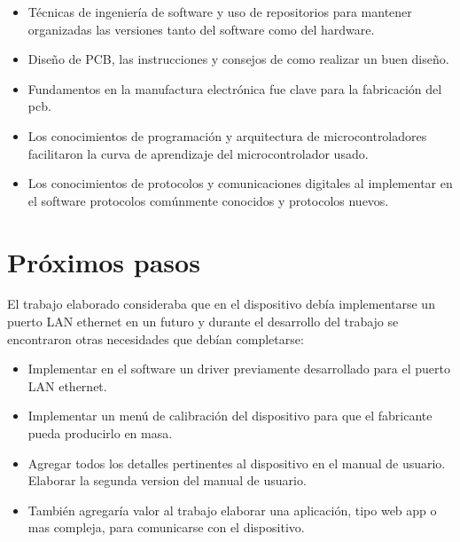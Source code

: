 \begin{itemize}
\item Técnicas de ingeniería de software y uso de repositorios para mantener organizadas las versiones tanto del software como del hardware.
\item Diseño de PCB, las instrucciones y consejos de como realizar un buen diseño.
\item Fundamentos en la manufactura electrónica fue clave para la fabricación del pcb.
\item Los conocimientos de programación y arquitectura de microcontroladores facilitaron la curva de aprendizaje del microcontrolador usado.
\item Los conocimientos de protocolos y comunicaciones digitales al implementar en el software protocolos comúnmente conocidos y protocolos nuevos.
\end{itemize}

\section{Próximos pasos}

El trabajo elaborado consideraba que en el dispositivo debía implementarse un puerto LAN ethernet en un futuro y durante el desarrollo del trabajo se encontraron otras necesidades que debían completarse:

\begin{itemize}
\item Implementar en el software un driver previamente desarrollado para el puerto LAN ethernet.
\item Implementar un menú de calibración del dispositivo para que el fabricante pueda producirlo en masa.
\item Agregar todos los detalles pertinentes al dispositivo en el manual de usuario. Elaborar la segunda version del manual de usuario.
\item También agregaría valor al trabajo elaborar una aplicación, tipo web app o mas compleja, para comunicarse con el dispositivo.
\end{itemize}







